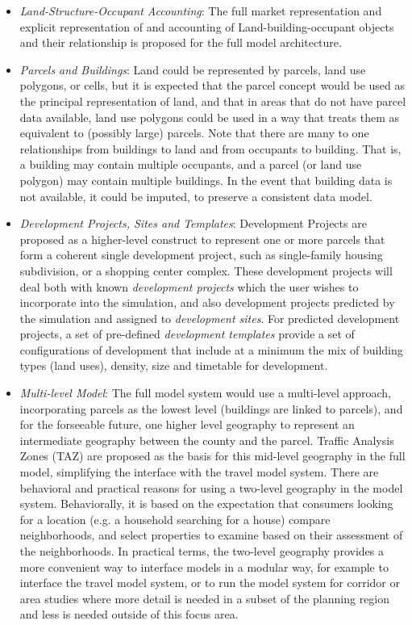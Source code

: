 \begin{itemize}

\item \emph{Land-Structure-Occupant Accounting}: The full market representation and explicit representation of and accounting of Land-building-occupant objects and their relationship is proposed for the full model architecture.  

\item \emph{Parcels and Buildings}: Land could be represented by parcels, land use polygons, or cells, but it is expected that  the parcel concept would be used as the principal representation of land, and that in areas that do not have parcel data available, land use polygons could be used in a way that treats them as equivalent to (possibly large) parcels.  Note that there are many to one relationships from buildings to land and from occupants to building.  That is, a building may contain multiple occupants, and a parcel (or land use polygon) may contain multiple buildings.  In the event that building data is not available, it could be imputed, to preserve a consistent data model.

\item \emph{Development Projects, Sites and Templates}: Development Projects are proposed as a higher-level construct to represent one or more parcels that form a coherent single development project, such as single-family housing subdivision, or a shopping center complex.  These development projects will deal both with known \emph{development projects} which the user wishes to incorporate into the simulation, and also development projects predicted by the simulation and assigned to \emph{development sites}.  For predicted development projects, a set of pre-defined \emph{development templates} provide a set of configurations of development that include at a minimum the mix of building types (land uses), density, size and timetable for development.

\item \emph{Multi-level Model}: The full model system would use a multi-level approach, incorporating parcels as the lowest level (buildings are linked to parcels), and for the forseeable future, one higher level geography to represent an intermediate geography between the county and the parcel.  Traffic Analysis Zones (TAZ) are proposed as the basis for this mid-level geography in the full model, simplifying the interface with the travel model system. There are behavioral and practical reasons for using a two-level geography in the model system.  Behaviorally, it is based on the expectation that consumers looking for a location (e.g. a household searching for a house) compare neighborhoods, and select properties to examine based on their assessment of the neighborhoods. In practical terms, the two-level geography provides a more convenient way to interface models in a modular way, for example to interface the travel model system, or to run the model system for corridor or area studies where more detail is needed in a subset of the planning region and less is needed outside of this focus area.


\end{itemize}
